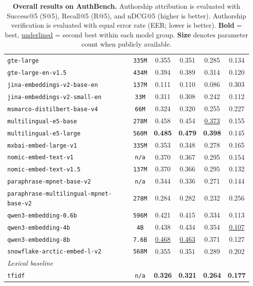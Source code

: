 \documentclass[11pt]{article}
\begin{document}
\begin{table}[h!]
{\begin{tabular}{lccccc}
\texttt{gte-large} & \texttt{335M} & 0.355 & 0.351 & 0.285 & 0.134 \\
\texttt{gte-large-en-v1.5} & \texttt{434M} & 0.394 & 0.389 & 0.314 & 0.120 \\
\texttt{jina-embeddings-v2-base-en} & \texttt{137M} & 0.111 & 0.110 & 0.086 & 0.303 \\
\texttt{jina-embeddings-v2-small-en} & \texttt{33M} & 0.311 & 0.308 & 0.242 & 0.112 \\
\texttt{msmarco-distilbert-base-v4} & \texttt{66M} & 0.324 & 0.320 & 0.255 & 0.227 \\
\texttt{multilingual-e5-base} & \texttt{278M} & 0.458 & 0.454 & \underline{0.373} & 0.155 \\
\texttt{multilingual-e5-large} & \texttt{560M} & \textbf{0.485} & \textbf{0.479} & \textbf{0.398} & 0.145 \\
\texttt{mxbai-embed-large-v1} & \texttt{335M} & 0.353 & 0.348 & 0.278 & 0.165 \\
\texttt{nomic-embed-text-v1} & \texttt{n/a} & 0.370 & 0.367 & 0.295 & 0.154 \\
\texttt{nomic-embed-text-v1.5} & \texttt{137M} & 0.370 & 0.366 & 0.295 & 0.132 \\
\texttt{paraphrase-mpnet-base-v2} & \texttt{n/a} & 0.344 & 0.336 & 0.271 & 0.144 \\
\texttt{paraphrase-multilingual-mpnet-base-v2} & \texttt{278M} & 0.284 & 0.282 & 0.232 & 0.256 \\
\texttt{qwen3-embedding-0.6b} & \texttt{596M} & 0.421 & 0.415 & 0.334 & 0.113 \\
\texttt{qwen3-embedding-4b} & \texttt{4B} & 0.438 & 0.434 & 0.354 & \underline{0.107} \\
\texttt{qwen3-embedding-8b} & \texttt{7.6B} & \underline{0.468} & \underline{0.463} & 0.371 & 0.127 \\
\texttt{snowflake-arctic-embed-l-v2} & \texttt{568M} & 0.355 & 0.351 & 0.289 & 0.202 \\
\midrule
\multicolumn{6}{l}{\textit{Lexical baseline}} \\
\midrule
\texttt{tfidf} & \texttt{n/a} & \textbf{0.326} & \textbf{0.321} & \textbf{0.264} & \textbf{0.177} \\
\bottomrule
\end{tabular}
}
\caption{\textbf{Overall results on AuthBench.} Authorship attribution is evaluated with Success@5 (S@5), Recall@5 (R@5), and nDCG@5 (higher is better). Authorship verification is evaluated with equal error rate (EER; lower is better). \textbf{Bold} = best, \underline{underlined} = second best within each model group. \textbf{Size} denotes parameter count when publicly available.}
\label{tab:overall-leaderboard-full}
\end{table}
\end{document}
